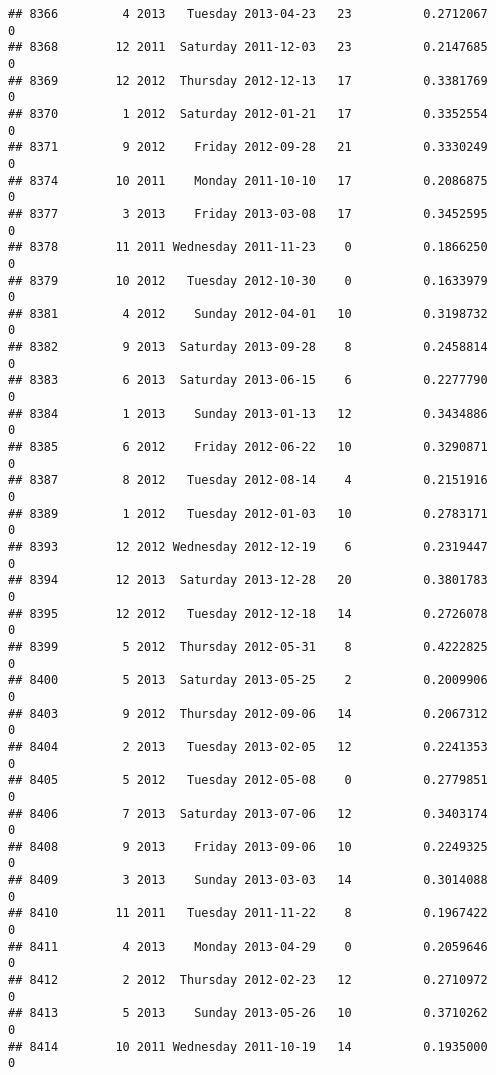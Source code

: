 \documentclass[
]{article}
\begin{document}
\begin{verbatim}
## 8366         4 2013   Tuesday 2013-04-23   23          0.2712067             0
## 8368        12 2011  Saturday 2011-12-03   23          0.2147685             0
## 8369        12 2012  Thursday 2012-12-13   17          0.3381769             0
## 8370         1 2012  Saturday 2012-01-21   17          0.3352554             0
## 8371         9 2012    Friday 2012-09-28   21          0.3330249             0
## 8374        10 2011    Monday 2011-10-10   17          0.2086875             0
## 8377         3 2013    Friday 2013-03-08   17          0.3452595             0
## 8378        11 2011 Wednesday 2011-11-23    0          0.1866250             0
## 8379        10 2012   Tuesday 2012-10-30    0          0.1633979             0
## 8381         4 2012    Sunday 2012-04-01   10          0.3198732             0
## 8382         9 2013  Saturday 2013-09-28    8          0.2458814             0
## 8383         6 2013  Saturday 2013-06-15    6          0.2277790             0
## 8384         1 2013    Sunday 2013-01-13   12          0.3434886             0
## 8385         6 2012    Friday 2012-06-22   10          0.3290871             0
## 8387         8 2012   Tuesday 2012-08-14    4          0.2151916             0
## 8389         1 2012   Tuesday 2012-01-03   10          0.2783171             0
## 8393        12 2012 Wednesday 2012-12-19    6          0.2319447             0
## 8394        12 2013  Saturday 2013-12-28   20          0.3801783             0
## 8395        12 2012   Tuesday 2012-12-18   14          0.2726078             0
## 8399         5 2012  Thursday 2012-05-31    8          0.4222825             0
## 8400         5 2013  Saturday 2013-05-25    2          0.2009906             0
## 8403         9 2012  Thursday 2012-09-06   14          0.2067312             0
## 8404         2 2013   Tuesday 2013-02-05   12          0.2241353             0
## 8405         5 2012   Tuesday 2012-05-08    0          0.2779851             0
## 8406         7 2013  Saturday 2013-07-06   12          0.3403174             0
## 8408         9 2013    Friday 2013-09-06   10          0.2249325             0
## 8409         3 2013    Sunday 2013-03-03   14          0.3014088             0
## 8410        11 2011   Tuesday 2011-11-22    8          0.1967422             0
## 8411         4 2013    Monday 2013-04-29    0          0.2059646             0
## 8412         2 2012  Thursday 2012-02-23   12          0.2710972             0
## 8413         5 2013    Sunday 2013-05-26   10          0.3710262             0
## 8414        10 2011 Wednesday 2011-10-19   14          0.1935000             0

\end{verbatim}
\end{document}
